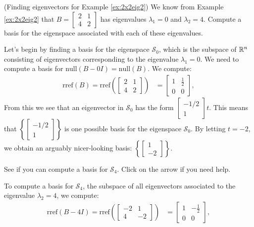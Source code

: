 \documentclass{ximera}
\begin{document}
\begin{example}\label{ex:eigvectors2x2eig2} (Finding eigenvectors for Example \ref{ex:2x2eig2}) 
We know from Example \ref{ex:2x2eig2} that $B=\begin{bmatrix} 2& 1\\ 4&2
\end{bmatrix}$ has eigenvalues $\lambda_1=0$ and $\lambda_2=4$.  Compute a basis for the eigenspace associated with each of these eigenvalues.
\begin{explanation}
Let's begin by finding a basis for the eigenspace $\mathcal{S}_0$, which is the subspace of $\mathbb{R}^n$ consisting of eigenvectors corresponding to the eigenvalue $\lambda_1=0$.  We need to compute a basis for $\mbox{null}(B-0I) = \mbox{null}(B)$.  We compute:
\begin{align*}\mbox{rref}(B)=\mbox{rref}\left(\begin{bmatrix}2&1\\4&2\end{bmatrix}\right)&=\begin{bmatrix}1&\frac{1}{2}\\0&0\end{bmatrix},
\end{align*}
From this we see that an eigenvector in $\mathcal{S}_0$ has the form $\begin{bmatrix}-1/2\\1\end{bmatrix}t$. %
This means that $\left\{\begin{bmatrix}-1/2\\1\end{bmatrix}\right\}$ is one possible basis for the eigenspace $\mathcal{S}_0$.  By letting $t=-2$, we obtain an arguably nicer-looking basis: $\left\{\begin{bmatrix}1\\-2\end{bmatrix}\right\}$. 

See if you can compute a basis for $\mathcal{S}_4$.  Click on the arrow if you need help.

\begin{hint}
To compute a basis for $\mathcal{S}_4$, the subspace of all eigenvectors associated to the eigenvalue $\lambda_2=4$, we compute:
\begin{align*}\mbox{rref}(B-4I)=\mbox{rref}\left(\begin{bmatrix}-2&1\\4&-2\end{bmatrix}\right)&=\begin{bmatrix}1&-\frac{1}{2}\\0&0\end{bmatrix},
\end{align*}
\end{hint}


\end{explanation}
\end{example}
\end{document}
